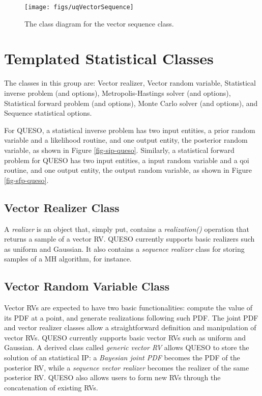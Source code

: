 \begin{figure}[htpb]
\centering
\texttt{[image: figs/uqVectorSequence]}
\vspace{-8pt}
\caption{The class diagram for the vector sequence class.}
\label{fig-vector-sequence-class}
\end{figure}



\section{Templated Statistical Classes}

The classes in this group are: Vector realizer, Vector random variable, Statistical inverse problem (and options), Metropolis-Hastings solver (and options), Statistical forward problem (and options), Monte Carlo solver (and options), and Sequence statistical options.

For QUESO, a statistical inverse problem has two input entities, a prior random variable and
a likelihood routine, and one output entity, the posterior random variable, as shown in Figure \ref{fig-sip-queso}.
%
Similarly, a statistical forward problem for QUESO has two input entities, a input random variable and
a qoi routine, and one output entity, the output random variable, as shown in Figure \ref{fig-sfp-queso}.


\subsection{Vector Realizer Class}
%
A {\it realizer} is an object that, simply put, contains a {\it realization()} operation that returns a sample of a vector RV.
QUESO currently supports basic realizers such as uniform and Gaussian.
It also contains a {\it sequence realizer} class for storing samples of a MH algorithm, for instance.




\subsection{Vector Random Variable Class}
%
Vector RVs are expected to have two basic functionalities:
compute the value of its PDF at a point, and generate realizations following such PDF.
The joint PDF and vector realizer classes allow a straightforward definition and manipulation of vector RVs.
QUESO currently supports basic vector RVs such as uniform and Gaussian.
A derived class called {\it generic vector RV} allows QUESO to store the solution of an statistical IP:
a {\it Bayesian joint PDF} becomes the PDF of the posterior RV, while a {\it sequence vector realizer} becomes the realizer of the same posterior RV.
QUESO also allows users to form new RVs through the concatenation of existing RVs.


